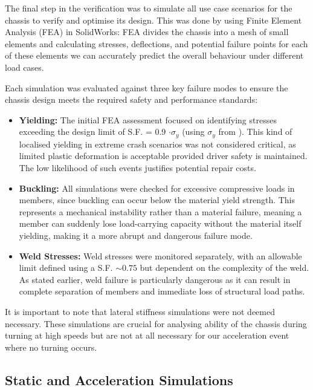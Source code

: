 \documentclass[11pt, a4paper]{report}
\numberwithin{equation}{section}
\begin{document}
\begin{refsection}
The final step in the verification was to simulate all use case scenarios for the chassis to verify and optimise its design. This was done by using Finite Element Analysis (FEA) \cite{irjet2019fea} in SolidWorks: FEA divides the chassis into a mesh of small elements and calculating stresses, deflections, and potential failure points for each of these elements we can accurately predict the overall behaviour under different load cases.

Each simulation was evaluated against three key failure modes to ensure the chassis design meets the required safety and performance standards:

\begin{itemize}
    \item \textbf{Yielding:} The initial FEA assessment focused on identifying stresses exceeding the design limit of S.F. = 0.9 $\cdot \sigma_y$ (using $\sigma_y$ from \cite{matweb_aisi1020}). This kind of localised yielding in extreme crash scenarios was not considered critical, as limited plastic deformation is acceptable provided driver safety is maintained. The low likelihood of such events justifies potential repair costs.
    \item \textbf{Buckling:} All simulations were checked for excessive compressive loads in members, since buckling can occur below the material yield strength. This represents a mechanical instability rather than a material failure, meaning a member can suddenly lose load-carrying capacity without the material itself yielding, making it a more abrupt and dangerous failure mode. 
    \item \textbf{Weld Stresses:} Weld stresses were monitored separately, with an allowable limit defined using a S.F. $\sim 0.75$ but dependent on the complexity of the weld. As stated earlier, weld failure is particularly dangerous as it can result in complete separation of members and immediate loss of structural load paths.
\end{itemize}

It is important to note that lateral stiffness simulations were not deemed necessary. These simulations are crucial for analysing ability of the chassis during turning at high speeds but are not at all necessary for our acceleration event where no turning occurs.

\subsection{Static and Acceleration Simulations}
\label{sec:static_acc_load}


\end{refsection}
\end{document}
